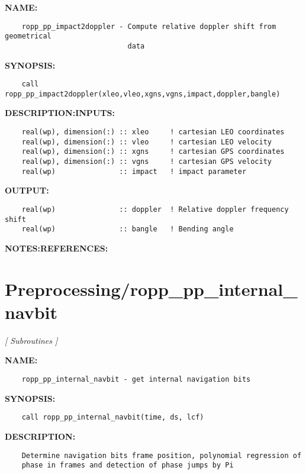 \label{ch:robo74}
\label{ch:Preprocessing_ropp_pp_impact2doppler}
\textbf{NAME:}\hspace{0.08in}\begin{Verbatim}
    ropp_pp_impact2doppler - Compute relative doppler shift from geometrical
                             data
\end{Verbatim}
\textbf{SYNOPSIS:}\hspace{0.08in}\begin{Verbatim}
    call ropp_pp_impact2doppler(xleo,vleo,xgns,vgns,impact,doppler,bangle)
\end{Verbatim}
\textbf{DESCRIPTION:}\hspace{0.08in}\textbf{INPUTS:}\hspace{0.08in}\begin{Verbatim}
    real(wp), dimension(:) :: xleo     ! cartesian LEO coordinates
    real(wp), dimension(:) :: vleo     ! cartesian LEO velocity
    real(wp), dimension(:) :: xgns     ! cartesian GPS coordinates
    real(wp), dimension(:) :: vgns     ! cartesian GPS velocity
    real(wp)               :: impact   ! impact parameter
\end{Verbatim}
\textbf{OUTPUT:}\hspace{0.08in}\begin{Verbatim}
    real(wp)               :: doppler  ! Relative doppler frequency shift
    real(wp)               :: bangle   ! Bending angle
\end{Verbatim}
\textbf{NOTES:}\hspace{0.08in}\textbf{REFERENCES:}\hspace{0.08in}\section{Preprocessing/ropp\_pp\_internal\_navbit}
\textsl{[ Subroutines ]}

\label{ch:robo75}
\label{ch:Preprocessing_ropp_pp_internal_navbit}
\textbf{NAME:}\hspace{0.08in}\begin{Verbatim}
    ropp_pp_internal_navbit - get internal navigation bits
\end{Verbatim}
\textbf{SYNOPSIS:}\hspace{0.08in}\begin{Verbatim}
    call ropp_pp_internal_navbit(time, ds, lcf)
\end{Verbatim}
\textbf{DESCRIPTION:}\hspace{0.08in}\begin{Verbatim}
    Determine navigation bits frame position, polynomial regression of
    phase in frames and detection of phase jumps by Pi
\end{Verbatim}
